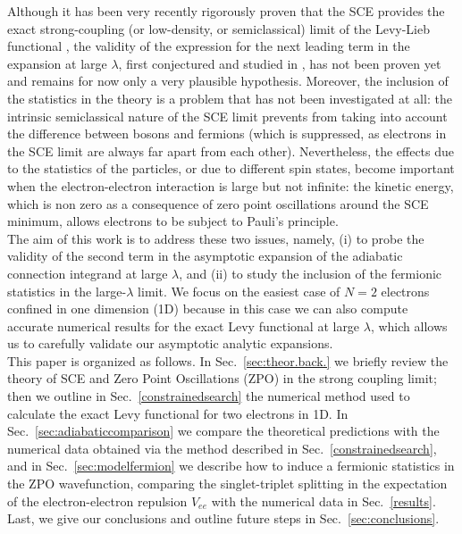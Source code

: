 \documentclass[aps,pra,twocolumn,superscriptaddress]{revtex4}
\begin{document}
Although it has been very recently rigorously proven that the SCE provides the exact strong-coupling (or low-density, or semiclassical) limit of the Levy-Lieb functional \citep{Lew-arxiv-17,CotFriKlu-arxiv-17}, the validity of the expression for the next leading term in the expansion at large $\lambda$, first conjectured and studied in \citep{Sei-PRA-99,GorVigSei-JCTC-09}, has not been proven yet and remains for now only a very plausible hypothesis.
Moreover, the inclusion of the statistics in the theory is a problem that has not been investigated at all: the intrinsic semiclassical nature of the SCE limit prevents from taking into account the difference between bosons and fermions (which is suppressed, as electrons in the SCE limit are always far apart from each other). Nevertheless, the effects due to the statistics of the particles, or due to different spin states, become important when the electron-electron interaction is large but not infinite: the kinetic energy, which is non zero as a consequence of zero point oscillations around the SCE minimum, allows electrons to be subject to Pauli's principle.\\
The aim of this work is to address these two issues, namely, (i) to probe the validity of the second term in the asymptotic expansion of the adiabatic connection integrand at large $\lambda$, and (ii) to study the inclusion of the fermionic statistics in the large-$\lambda$ limit. We focus on the easiest case of $N=2$ electrons confined in one dimension (1D) because in this case we can also compute accurate numerical results for the exact Levy functional at large $\lambda$, which allows us to carefully validate our asymptotic analytic expansions.
\\This paper is organized as follows. In Sec.~\ref{sec:theor.back.} we briefly review the theory of SCE and Zero Point Oscillations (ZPO) in the strong coupling limit; then we outline in Sec.~\ref{constrainedsearch} the numerical method used to calculate the exact Levy functional for two electrons in 1D.
In Sec.~\ref{sec:adiabaticcomparison} we compare the theoretical predictions with the numerical data obtained via the method described in Sec.~\ref{constrainedsearch}, and in Sec.~\ref{sec:modelfermion} we describe how to induce a fermionic statistics in the ZPO wavefunction, comparing the singlet-triplet splitting in the expectation of the electron-electron repulsion $\hat{V}_{ee}$ with the numerical data in Sec.~\ref{results}. Last, we give our conclusions and outline future steps in Sec.~\ref{sec:conclusions}.
\end{document}
